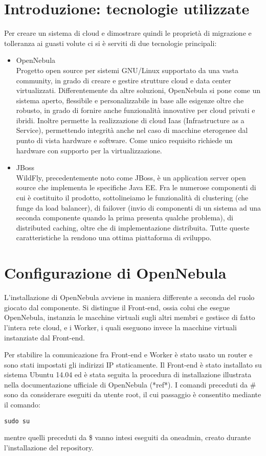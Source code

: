 \documentclass[twoside]{article}
\begin{document}
\section{Introduzione: tecnologie utilizzate}
Per creare un sistema di cloud e dimostrare quindi le proprietà di migrazione e
tolleranza ai guasti volute ci si è serviti di due tecnologie principali:
\begin{itemize}
	\item OpenNebula \\
		  Progetto open source per sistemi GNU/Linux supportato da una vasta community, in grado di
		  creare e gestire strutture cloud e data center virtualizzati. Differentemente da altre soluzioni,
		  OpenNebula si pone come un sistema aperto, flessibile e personalizzabile in base alle esigenze
		  oltre che robusto, in grado di fornire anche funzionalità innovative per cloud privati e ibridi.
		  Inoltre permette la realizzazione di cloud Iaas (Infrastructure as a Service), permettendo integrità
		  anche nel caso di macchine eterogenee dal punto di vista hardware e software. Come unico requisito
		  richiede un hardware con supporto per la virtualizzazione.
	\item JBoss \\
		  WildFly, precedentemente noto come JBoss, è un application server open source che implementa
		  le specifiche Java EE. Fra le numerose componenti di cui è costituito il prodotto, sottolineiamo
		  le funzionalità di clustering (che funge da load balancer), di failover (invio di componenti di
		  un sistema ad una seconda componente quando la prima presenta qualche problema), di distributed
		  caching, oltre che di implementazione distribuita. Tutte queste caratteristiche la rendono una
		  ottima piattaforma di sviluppo.
\end{itemize}

\section{Configurazione di OpenNebula}
L'installazione di OpenNebula avviene in maniera differente a seconda del ruolo giocato dal componente.
Si distingue il Front-end, ossia colui che esegue OpenNebula, instanzia le macchine virtuali sugli altri
membri e gestisce di fatto l'intera rete cloud, e i Worker, i quali eseguono invece la macchine virtuali
instanziate dal Front-end.

Per stabilire la comunicazione fra Front-end e Worker è stato usato un router e sono stati impostati
gli indirizzi IP staticamente. Il Front-end è stato installato su sistema Ubuntu 14.04 ed è stata seguita
la procedura di installazione illustrata nella documentazione ufficiale di OpenNebula (*ref*).
I comandi preceduti da \# sono da considerare eseguiti da utente root, il cui passaggio è consentito
mediante il comando:
\begin{lstlisting}[frame=trBL]
sudo su
\end{lstlisting}
mentre quelli preceduti da \$ vanno intesi eseguiti da oneadmin, creato durante l'installazione del
repository.
\end{document}
